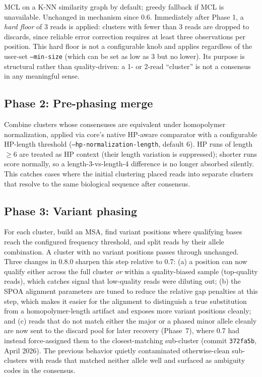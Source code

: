 \documentclass[11pt]{article}
\begin{document}
MCL on a K-NN similarity graph by default; greedy fallback if MCL is
unavailable. Unchanged in mechanism since 0.6. Immediately after Phase 1,
a \emph{hard floor} of 3 reads is applied: clusters with fewer than 3 reads
are dropped to discards, since reliable error correction requires at least
three observations per position. This hard floor is not a configurable knob
and applies regardless of the user-set \texttt{--min-size} (which can be set
as low as 3 but no lower). Its purpose is structural rather than
quality-driven: a 1- or 2-read ``cluster'' is not a consensus in any
meaningful sense.

\subsection*{Phase 2: Pre-phasing merge}

Combine clusters whose consensuses are equivalent under homopolymer
normalization, applied via core's native HP-aware comparator with a
configurable HP-length threshold (\texttt{--hp-normalization-length},
default 6). HP runs of length $\geq 6$ are treated as HP context (their
length variation is suppressed); shorter runs score normally, so a
length-3-vs-length-4 difference is no longer absorbed silently. This
catches cases where the initial clustering placed reads into separate
clusters that resolve to the same biological sequence after consensus.

\subsection*{Phase 3: Variant phasing}

For each cluster, build an MSA, find variant positions where qualifying bases
reach the configured frequency threshold, and split reads by their allele
combination. A cluster with no variant positions passes through unchanged.
Three changes in 0.8.0 sharpen this step relative to 0.7: (a) a position
can now qualify either across the full cluster \emph{or} within a
quality-biased sample (top-quality reads), which catches signal that
low-quality reads were diluting out; (b) the SPOA alignment parameters are
tuned to reduce the relative gap penalties at this step, which makes it
easier for the alignment to distinguish a true substitution from a
homopolymer-length artifact and exposes more variant positions cleanly; and
(c) reads that do not match either the major or a phased minor allele
cleanly are now sent to the discard pool for later recovery (Phase~7),
where 0.7 had instead force-assigned them to the closest-matching
sub-cluster (commit \texttt{372fa5b}, April 2026). The previous behavior
quietly contaminated otherwise-clean sub-clusters with reads that matched
neither allele well and surfaced as ambiguity codes in the consensus.
\end{document}
